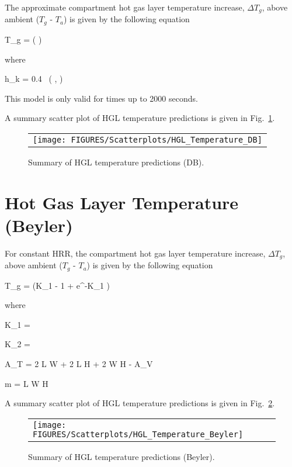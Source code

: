 The approximate compartment hot gas layer temperature increase, $\Delta T_g$, above ambient ($T_g$ - $T_a$) is given by the following equation

\be
\Delta T_g = \left(  \right)
\ee

\noindent where

\be
h_k = 0.4\  \left(  ,  \right)
\ee

\noindent This model is only valid for times up to 2000 seconds.

\clearpage

A summary scatter plot of HGL temperature predictions is given in Fig.~\ref{hgl_temperature_DB_summary}.

\begin{figure}[ht]
\begin{center}
\begin{tabular}{l}
\texttt{[image: FIGURES/Scatterplots/HGL\_Temperature\_DB]}
\end{tabular}
\end{center}
\caption[Summary of HGL temperature predictions (DB).]
{Summary of HGL temperature predictions (DB).}
\label{hgl_temperature_DB_summary}
\end{figure}


\clearpage


\section{Hot Gas Layer Temperature (Beyler)}

For constant HRR, the compartment hot gas layer temperature increase, $\Delta T_g$, above ambient ($T_g$ - $T_a$) is given by the following equation

\be
\Delta T_g =  (K_1  - 1 + e^{-K_1 })
\ee

\noindent where

\be
K_1 = 
\ee

\be
K_2 = 
\ee

\be
A_T = 2 L W + 2 L H + 2 W H - A_V
\ee

\be
m = L W H \rho
\ee

\clearpage

A summary scatter plot of HGL temperature predictions is given in Fig.~\ref{hgl_temperature_beyler_summary}. 

\begin{figure}[ht]
\begin{center}
\begin{tabular}{l}
\texttt{[image: FIGURES/Scatterplots/HGL\_Temperature\_Beyler]}
\end{tabular}
\end{center}
\caption[Summary of HGL temperature predictions (Beyler).]
{Summary of HGL temperature predictions (Beyler).}
\label{hgl_temperature_beyler_summary}
\end{figure}


